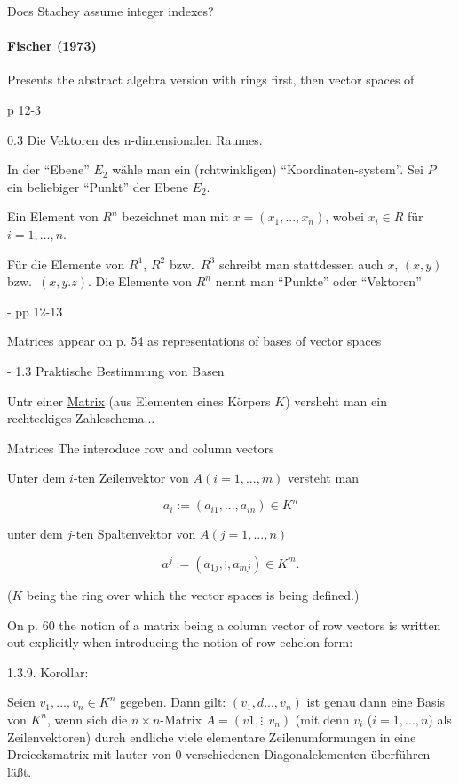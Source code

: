 Does Stachey assume integer indexes?



\paragraph{Fischer (1973)~\cite{Fischer1973}}

Presents the abstract algebra version with rings first, then vector spaces of

p 12-3

0.3 Die Vektoren des n-dimensionalen Raumes.

In der ``Ebene'' $E_2$ wähle man ein (rchtwinkligen) ``Koordinaten-system''. Sei $P$ ein beliebiger ``Punkt'' der Ebene $E_2$.

Ein Element von $R^n$ bezeichnet man mit $x = (x_1, ..., x_n)$, wobei $x_i \in R$ für $i = 1,..., n$.

Für die Elemente von $R^1$, $R^2$ bzw.\ $R^3$ schreibt man stattdessen auch $x$, $(x,y)$ bzw.\ $(x,y.z)$.
Die Elemente von $R^n$ nennt man ``Punkte'' oder ``Vektoren''

- pp 12-13

Matrices appear on p. 54 as representations of bases of vector spaces

- 1.3 Praktische Bestimmung von Basen

Untr einer \underline{Matrix} (aus Elementen eines Körpers $K$)  versheht man ein rechteckiges Zahleschema...

Matrices The interoduce row and column vectors

Unter dem $i$-ten \underline{Zeilenvektor} von $A (i=1, ..., m)$ versteht man

\[
a_i := (a_{i1}, ..., a_{in}) \in K^n
\]

unter dem $j$-ten Spaltenvektor von $A (j=1, ..., n)$

\[
a^j := (a_{1j}, \vdots, a_{mj}) \in K^m.
\]

($K$ being the ring over which the vector spaces is being defined.)

On p. 60 the notion of a matrix being a column vector of row vectors is written out explicitly when introducing the notion of row echelon form:

1.3.9. Korollar:

Seien $v_1, ..., v_n \in K^n$ gegeben. Dann gilt:
$(v_1, d..., v_n)$ ist genau dann eine Basis von $K^n$, wenn sich die $n\times n$-Matrix $A = (v1, \vdots, v_n)$ (mit denn $v_i$ ($i=1,...,n$) als Zeilenvektoren)
durch endliche viele elementare Zeilenumformungen in eine Dreiecksmatrix mit lauter von 0 verschiedenen Diagonalelementen überführen läßt.

